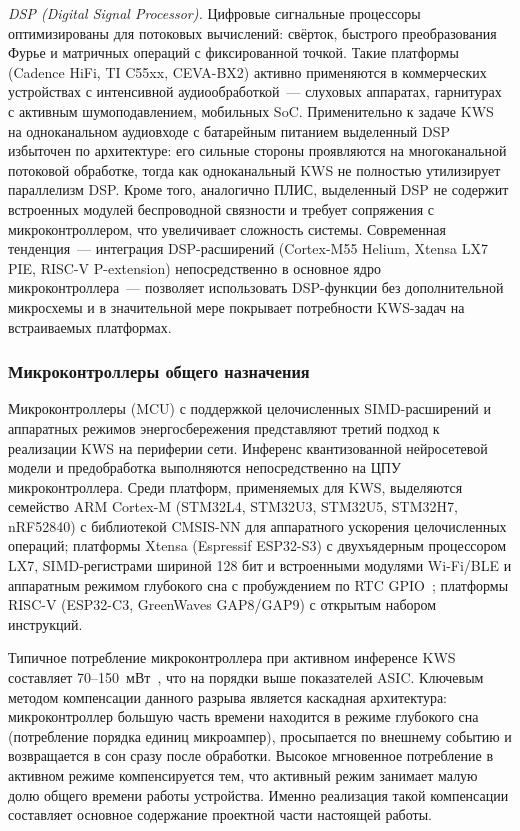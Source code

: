 \textit{DSP (Digital Signal Processor).} Цифровые сигнальные процессоры
оптимизированы для потоковых вычислений: свёрток, быстрого преобразования
Фурье и матричных операций с фиксированной точкой. Такие платформы
(Cadence HiFi, TI C55xx, CEVA-BX2) активно применяются в коммерческих
устройствах с интенсивной аудиообработкой~--- слуховых аппаратах,
гарнитурах с активным шумоподавлением, мобильных SoC. Применительно к
задаче KWS на одноканальном аудиовходе с батарейным питанием выделенный
DSP избыточен по архитектуре: его сильные стороны проявляются на
многоканальной потоковой обработке, тогда как одноканальный KWS не
полностью утилизирует параллелизм DSP. Кроме того, аналогично ПЛИС,
выделенный DSP не содержит встроенных модулей беспроводной связности и
требует сопряжения с микроконтроллером, что увеличивает сложность
системы. Современная тенденция~--- интеграция DSP-расширений (Cortex-M55
Helium, Xtensa LX7 PIE, RISC-V P-extension) непосредственно в основное
ядро микроконтроллера~--- позволяет использовать DSP-функции без
дополнительной микросхемы и в значительной мере покрывает потребности
KWS-задач на встраиваемых платформах.

\subsubsection{Микроконтроллеры общего назначения}

Микроконтроллеры (MCU) с поддержкой целочисленных SIMD-расширений и
аппаратных режимов энергосбережения представляют третий подход к
реализации KWS на периферии сети. Инференс квантизованной нейросетевой
модели и предобработка выполняются непосредственно на ЦПУ
микроконтроллера. Среди платформ, применяемых для KWS, выделяются
семейство ARM Cortex-M (STM32L4, STM32U3, STM32U5, STM32H7, nRF52840) с
библиотекой CMSIS-NN для аппаратного ускорения целочисленных операций;
платформы Xtensa (Espressif ESP32-S3) с двухъядерным процессором LX7,
SIMD-регистрами шириной 128 бит и встроенными модулями Wi-Fi/BLE и
аппаратным режимом глубокого сна с пробуждением по RTC GPIO~\cite{src:9};
платформы RISC-V (ESP32-C3, GreenWaves GAP8/GAP9) с открытым набором
инструкций.

Типичное потребление микроконтроллера при активном инференсе KWS
составляет 70--150~мВт~\cite{src:8}, что на порядки выше показателей
ASIC. Ключевым методом компенсации данного разрыва является
каскадная архитектура: микроконтроллер большую часть времени находится в
режиме глубокого сна (потребление порядка единиц микроампер), просыпается
по внешнему событию и возвращается в сон сразу после обработки. Высокое
мгновенное потребление в активном режиме компенсируется тем, что
активный режим занимает малую долю общего времени работы устройства.
Именно реализация такой компенсации составляет основное содержание
проектной части настоящей работы.

